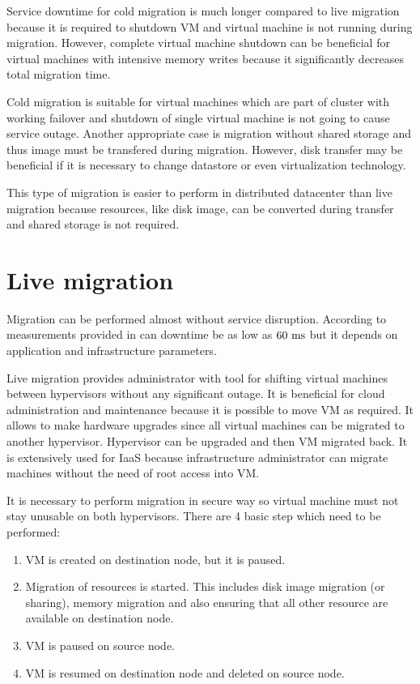 Service downtime for cold migration is much longer compared to live migration because it is required to shutdown \Ac{VM} and virtual machine is not running during migration. However, complete virtual machine shutdown can be beneficial for virtual machines with intensive memory writes because it significantly decreases total migration time. 

Cold migration is suitable for virtual machines which are part of cluster with working failover and shutdown of single virtual machine is not going to cause service outage. Another appropriate case is migration without shared storage and thus image must be transfered during migration. However, disk transfer may be beneficial if it is necessary to change datastore or even virtualization technology.

This type of migration is easier to perform in distributed datacenter than live migration because resources, like disk image, can be converted during transfer and shared storage is not required.


\section{Live migration}

Migration can be performed  almost without service disruption. According to measurements provided in \cite{live-migration-of-vms} can downtime be as low as $60~\mathrm{ms}$ but it depends on application and infrastructure parameters.

Live migration provides administrator with tool for shifting virtual machines between hypervisors without any significant outage. It is beneficial for cloud administration and maintenance because it is possible to move \Ac{VM} as required. It allows to make hardware upgrades since all virtual machines can be migrated to another hypervisor. Hypervisor can be upgraded and then \Ac{VM} migrated back. 
It is extensively used for \Ac{IaaS} because infrastructure administrator can migrate machines without the need of root access into \Ac{VM}. 

It is necessary to perform migration in secure way so virtual machine must not stay unusable on both hypervisors. There are 4 basic step which need to be performed:
\begin{enumerate}
	\item \Ac{VM} is created on destination node, but it is paused.
	\item Migration of resources is started. This includes disk image migration (or sharing), memory migration and also ensuring that all other resource are available on destination node.
	\item \Ac{VM} is paused on source node.
	\item \Ac{VM} is resumed on destination node and deleted on source node.
\end{enumerate}

